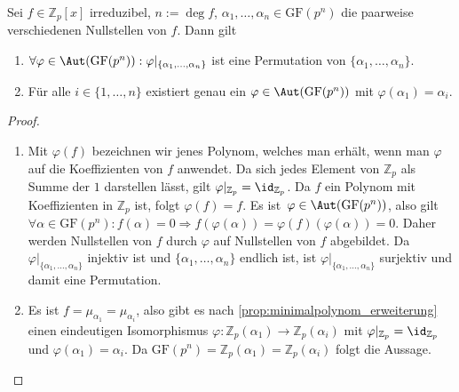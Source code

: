 \begin{lemma}
    Sei $f \in \mathbb{Z}_p[x]$ irreduzibel, $n := \deg f$, $\alpha_1, \ldots, \alpha_n \in \mathrm{GF}(p^n)$ die paarweise verschiedenen Nullstellen von $f$. Dann gilt
    \begin{enumerate}
        \item $\forall\varphi\in\Aut(\mathrm{GF}(p^n)): \varphi\vert_{\{\alpha_1, \ldots, \alpha_n\}}$ ist eine Permutation von $\{\alpha_1, \ldots, \alpha_n\}$.
        \item Für alle $i \in \{1, \ldots, n\}$ existiert genau ein $\varphi\in\Aut(\mathrm{GF}(p^n))$ mit $\varphi(\alpha_1) = \alpha_i$.
    \end{enumerate}
\end{lemma}
\begin{proof}{\ }
    \begin{enumerate}
        \item Mit $\varphi(f)$ bezeichnen wir jenes Polynom, welches man erhält, wenn man $\varphi$ auf die Koeffizienten von $f$ anwendet. Da sich jedes Element von $\mathbb{Z}_p$ als Summe der $1$ darstellen lässt, gilt $\varphi\vert_{\mathbb{Z}_p}=\id_{\mathbb{Z}_p}$. Da $f$ ein Polynom mit Koeffizienten in $\mathbb{Z}_p$ ist, folgt $\varphi(f)=f$. Es ist $\varphi \in \Aut(\mathrm{GF}(p^n))$, also gilt $\forall\alpha\in \mathrm{GF}(p^n): f(\alpha) = 0 \Rightarrow f(\varphi(\alpha)) = \varphi(f)(\varphi(\alpha)) = 0$. Daher werden Nullstellen von $f$ durch $\varphi$ auf Nullstellen von $f$ abgebildet. 
        Da $\varphi\vert_{\{\alpha_1, \ldots, \alpha_n\}}$ injektiv ist und $\{\alpha_1, \ldots, \alpha_n\}$ endlich ist, ist $\varphi\vert_{\{\alpha_1, \ldots, \alpha_n\}}$ surjektiv und damit eine Permutation.

        \item Es ist $f = \mu_{\alpha_1} = \mu_{\alpha_i}$, also gibt es nach \cref{prop:minimalpolynom_erweiterung} einen eindeutigen Isomorphismus $\varphi: \mathbb{Z}_p(\alpha_1) \to \mathbb{Z}_p(\alpha_i)$ mit $\varphi\vert_{\mathbb{Z}_p} = \id_{\mathbb{Z}_p}$ und $\varphi(\alpha_1) = \alpha_i$. Da $\mathrm{GF}(p^n) = \mathbb{Z}_p(\alpha_1) = \mathbb{Z}_p(\alpha_i)$ folgt die Aussage.
     \end{enumerate}
\end{proof}

